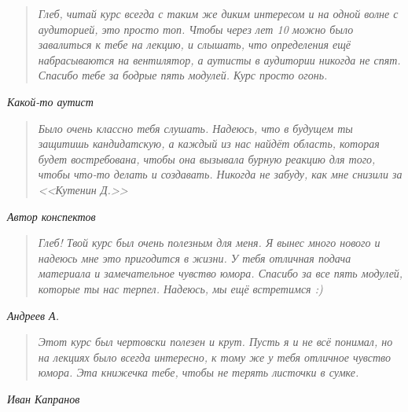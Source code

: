 \documentclass[a4paper, 12pt]{article}
\begin{document}
\begin{quote}
\textit{
Глеб, читай курс всегда с таким же диким интересом и на одной волне с 
аудиторией, это просто топ. Чтобы через лет 10 можно было завалиться к тебе на
лекцию, и слышать, что определения ещё набрасываются на вентилятор, а аутисты 
в аудитории никогда не спят. Спасибо тебе за бодрые пять модулей. Курс просто
огонь.
}
\end{quote}
\begin{flushright}
  \textit{Какой-то аутист}
\end{flushright}
\begin{quote}
\textit{
  Было очень классно тебя слушать. Надеюсь, что в будущем ты защитишь
  кандидатскую, а каждый из нас найдёт область, которая будет востребована,
  чтобы она вызывала бурную реакцию для того, чтобы что-то делать и создавать.
  Никогда не забуду, как мне снизили за <<Кутенин Д.>>
}
\end{quote}
\begin{flushright}
  \textit{Автор конспектов}
\end{flushright}

\begin{quote}
\textit{
  Глеб!
  Твой курс был очень полезным для меня. Я вынес много нового и надеюсь мне это 
  пригодится в жизни. У тебя отличная подача материала и замечательное чувство 
  юмора. Спасибо за все пять модулей, которые ты нас терпел. Надеюсь, мы ещё 
  встретимся :)
}
\end{quote}
\begin{flushright}
  \textit{Андреев А.}
\end{flushright}

\begin{quote}
\textit{
  Этот курс был чертовски полезен и крут. Пусть я и не всё понимал, но на 
  лекциях было всегда интересно, к тому же у тебя отличное чувство юмора. 
  Эта книжечка тебе, чтобы не терять листочки в сумке.
  }
\end{quote}
\begin{flushright}
  \textit{Иван Капранов}
\end{flushright}

\newpage

\tableofcontents
\newpage
\setcounter{page}{7}

\smallskip


\oball
\newpage

\oball
\clearpage

\oball
\newpage

\oball
\newpage

\oball
\newpage

\oball
\newpage

\oball
\newpage

\oball
\newpage

\oball
\newpage

\oball
\end{document}
